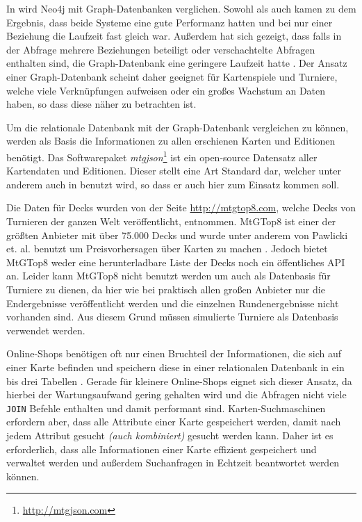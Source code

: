 In \cite{vicknair2010comparison, miller2013graph, jaiswal2013comparative} wird Neo4j mit Graph-Datenbanken verglichen. Sowohl \cite{vicknair2010comparison} als auch \cite{jaiswal2013comparative} kamen zu dem Ergebnis, dass beide Systeme eine gute Performanz hatten und bei nur einer Beziehung die Laufzeit fast gleich war. Außerdem hat sich gezeigt, dass falls in der Abfrage mehrere Beziehungen beteiligt oder verschachtelte Abfragen enthalten sind, die Graph-Datenbank eine geringere Laufzeit hatte \cite{jaiswal2013comparative}. Der Ansatz einer Graph-Datenbank scheint daher geeignet für Kartenspiele und Turniere, welche viele Verknüpfungen aufweisen oder ein großes Wachstum an Daten haben, so dass diese näher zu betrachten ist.

Um die relationale Datenbank mit der Graph-Datenbank vergleichen zu können, werden als Basis die Informationen zu allen erschienen Karten und Editionen benötigt. Das Softwarepaket \emph{mtgjson}\footnote{\url{http://mtgjson.com}} ist ein open-source Datensatz aller Kartendaten und Editionen. Dieser stellt eine Art Standard dar, welcher unter anderem auch in \cite{finkpredicting, perkhounkovfinancial, pawlicki2014prediction} benutzt wird, so dass er auch hier zum Einsatz kommen soll. 

Die Daten für Decks wurden von der Seite \url{http://mtgtop8.com}, welche Decks von Turnieren der ganzen Welt veröffentlicht, entnommen. MtGTop8 ist einer der größten Anbieter mit über 75.000 Decks und wurde unter anderem von Pawlicki et. al. benutzt um Preisvorhersagen über Karten zu machen \cite{pawlicki2014prediction}. Jedoch bietet MtGTop8 weder eine herunterladbare Liste der Decks noch ein öffentliches \ac{API} an. 
Leider kann MtGTop8 nicht benutzt werden um auch als Datenbasis für Turniere zu dienen, da hier wie bei praktisch allen großen Anbieter nur die Endergebnisse veröffentlicht werden und die einzelnen Rundenergebnisse nicht vorhanden sind. Aus diesem Grund müssen simulierte Turniere als Datenbasis verwendet werden.

Online-Shops benötigen oft nur einen Bruchteil der Informationen, die sich auf einer Karte befinden und speichern diese in einer relationalen Datenbank in ein bis drei Tabellen \cite{johnson2013online}. Gerade für kleinere Online-Shops eignet sich dieser Ansatz, da hierbei der Wartungsaufwand gering gehalten wird \cite{johnson2013online} und die Abfragen nicht viele \verb|JOIN| Befehle enthalten und damit performant sind. Karten-Suchmaschinen erfordern aber, dass alle Attribute einer Karte gespeichert werden, damit nach jedem Attribut gesucht \emph{(auch kombiniert)} gesucht werden kann. Daher ist es erforderlich, dass alle Informationen einer Karte effizient gespeichert und verwaltet werden und außerdem Suchanfragen in Echtzeit beantwortet werden können.

